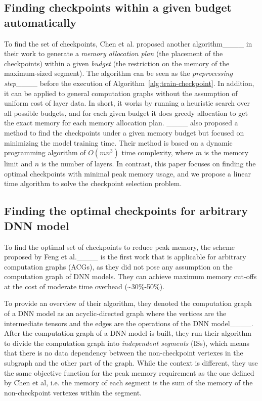 \subsection{Finding checkpoints within a given budget automatically}

To find the set of checkpoints, Chen et al. proposed another algorithm____ in their work to generate a {\em memory allocation plan} (the placement of the checkpoints) within a given {\em budget} (the restriction on the memory of the maximum-sized segment). 
The algorithm can be seen as the {\em preprocessing step}____ before the execution of Algorithm~\ref{alg:train-checkpoint}. 
In addition, it can be applied to general computation graphs without the assumption of uniform cost of layer data.
In short, it works by running a heuristic search over all possible budgets, and for each given budget it does greedy allocation to get the exact memory for each memory allocation plan.
____ also proposed a method to find the checkpoints under a given memory budget but focused on minimizing the model training time.
Their method is based on a dynamic programming algorithm of $O(mn^3)$ time complexity, where $m$ is the memory limit and $n$ is the number of layers.
In contrast, this paper focuses on finding the optimal checkpoints with minimal peak memory usage, and we propose a linear time algorithm to solve the checkpoint selection problem.



\subsection{Finding the optimal checkpoints for arbitrary DNN model}

To find the optimal set of checkpoints to reduce peak memory, the scheme proposed by Feng et al.____ is the first work that is applicable for arbitrary computation graphs (ACGs), as they did not pose any assumption on the computation graph of DNN models. They can achieve maximum memory cut-offs at the cost of moderate time overhead (\textasciitilde 30\%-50\%).

To provide an overview of their algorithm, they denoted the computation graph of a DNN model as an acyclic-directed graph where the vertices are the intermediate tensors and the edges are the operations of the DNN model____. 
After the computation graph of a DNN model is built, they run their algorithm to divide the computation graph into {\em independent segments} (ISs), which means that there is no data dependency between the non-checkpoint vertexes in the subgraph and the other part of the graph. While the context is different, they use the same objective function for the peak memory requirement as the one defined by Chen et al, i.e. the memory of each segment is the sum of the memory of the non-checkpoint vertexes within the segment.


